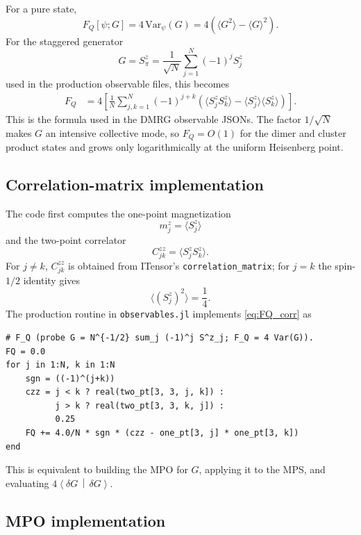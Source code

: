 \documentclass[11pt]{article}
\newcommand{\braket}[2]{\left\langle#1\,\middle|\,#2\right\rangle}
\newcommand{\FQ}{F_Q}
\newcommand{\dd}{\delta}
\begin{document}
For a pure state,
\begin{equation}
  \FQ[\psi;G]
  =
  4\,\mathrm{Var}_{\psi}(G)
  =
  4
  \left(
    \langle G^2\rangle-\langle G\rangle^2
  \right).
  \label{eq:FQ_var}
\end{equation}
For the staggered generator
\[
  G=S^z_\pi=\frac{1}{\sqrt N}\sum_{j=1}^{N}(-1)^j S^z_j
\]
used in the production observable files, this becomes
\begin{align}
  \FQ
  &=
  4
  \left[
    \frac1N
    \sum_{j,k=1}^{N}
    (-1)^{j+k}
    \left(
      \langle S^z_j S^z_k\rangle
      -
      \langle S^z_j\rangle\langle S^z_k\rangle
    \right)
  \right].
  \label{eq:FQ_corr}
\end{align}
This is the formula used in the DMRG observable JSONs.
The factor $1/\sqrt N$ makes $G$ an intensive collective mode, so
$\FQ=O(1)$ for the dimer and cluster product states and grows only
logarithmically at the uniform Heisenberg point.

\subsection{Correlation-matrix implementation}

The code first computes the one-point magnetization
\begin{equation}
  m_j^z=\langle S^z_j\rangle
\end{equation}
and the two-point correlator
\begin{equation}
  C^{zz}_{jk}=\langle S^z_jS^z_k\rangle .
\end{equation}
For $j\ne k$, $C^{zz}_{jk}$ is obtained from ITensor's
\texttt{correlation\_matrix}; for $j=k$ the spin-$1/2$ identity gives
\begin{equation}
  \langle (S^z_j)^2\rangle=\frac14.
\end{equation}
The production routine in \texttt{observables.jl} implements
\eqref{eq:FQ_corr} as
\begin{lstlisting}
# F_Q (probe G = N^{-1/2} sum_j (-1)^j S^z_j; F_Q = 4 Var(G)).
FQ = 0.0
for j in 1:N, k in 1:N
    sgn = ((-1)^(j+k))
    czz = j < k ? real(two_pt[3, 3, j, k]) :
          j > k ? real(two_pt[3, 3, k, j]) :
          0.25
    FQ += 4.0/N * sgn * (czz - one_pt[3, j] * one_pt[3, k])
end
\end{lstlisting}
This is equivalent to building the MPO for $G$, applying it to the MPS,
and evaluating $4\braket{\dd G}{\dd G}$.

\subsection{MPO implementation}
\end{document}
